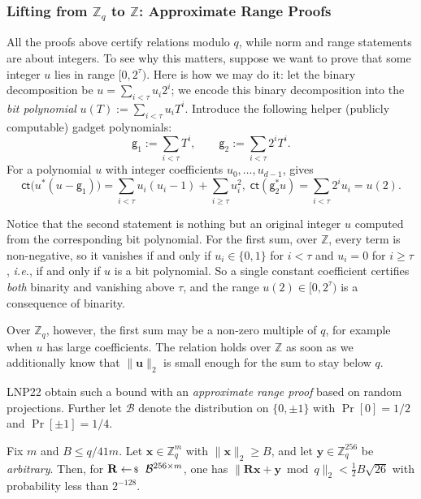 \documentclass[../../book.tex]{subfiles}
\begin{document}
\subsubsection{Lifting from $\mathbb{Z}_q$ to $\mathbb{Z}$: Approximate Range Proofs}

All the proofs above certify relations modulo $q$, while norm and range statements are about integers.
To see why this matters, suppose we want to prove that some integer $u$ lies in range $[0,2^{\tau})$.
Here is how we may do it: let the binary decomposition be $u = \sum_{i<\tau} u_i2^i$; we encode this binary decomposition into the \emph{bit polynomial} $u(T) := \sum_{i<\tau} u_iT^i$. 
Introduce the following helper (publicly computable) gadget polynomials:
\begin{equation*}
    \mathsf{g}_1 := \sum_{i<\tau} T^i, \qquad \mathsf{g}_2 := \sum_{i<\tau} 2^iT^i.
\end{equation*}
For a polynomial $u$ with integer coefficients $u_0, \dots, u_{d-1}$,  gives
\begin{equation*}
    \mathsf{ct}\bigl(u^{\ast}(u - \mathsf{g}_1)\bigr) = \sum_{i < \tau} u_i(u_i - 1) + \sum_{i \geq \tau} u_i^2, \; \mathsf{ct}(\mathsf{g}_2^{\ast}u) = \sum_{i<\tau} 2^iu_i = u(2).
\end{equation*}

Notice that the second statement is nothing but an original integer $u$ computed from the corresponding bit polynomial.
For the first sum, over $\mathbb{Z}$, every term is non-negative, so it vanishes if and only if $u_i \in \{0,1\}$ for $i < \tau$ and $u_i = 0$ for $i \geq \tau$, \textit{i.e.}, if and only if $u$ is a bit polynomial.
So a single constant coefficient certifies \emph{both} binarity and vanishing above $\tau$, and the range $u(2) \in [0, 2^{\tau})$ is a consequence of binarity.

Over $\mathbb{Z}_q$, however, the first sum may be a non-zero multiple of $q$, for example when $u$ has large coefficients.
The relation holds over $\mathbb{Z}$ as soon as we additionally know that $\|\mathbf{u}\|_2$ is small enough for the sum to stay below $q$.

LNP22 obtain such a bound with an \emph{approximate range proof} based on random projections.
Further let $\mathcal{B}$ denote the distribution on $\{0, \pm 1\}$ with $\Pr[0] = 1/2$ and $\Pr[\pm 1] = 1/4$.

\begin{lemma}\label{lemma:jl-projection}
    Fix $m$ and $B \leq q/41m$.
    Let $\mathbf{x} \in \mathbb{Z}_q^m$ with $\|\mathbf{x}\|_2 \geq B$, and let $\mathbf{y} \in \mathbb{Z}_q^{256}$ be \emph{arbitrary}.
    Then, for $\mathbf{R} \leftarrowS \mathcal{B}^{256 \times m}$, one has $\|\mathbf{R}\mathbf{x} + \mathbf{y} \bmod q\|_2 < \frac{1}{2}B\sqrt{26}$ with probability less than $2^{-128}$.
\end{lemma}
\end{document}
